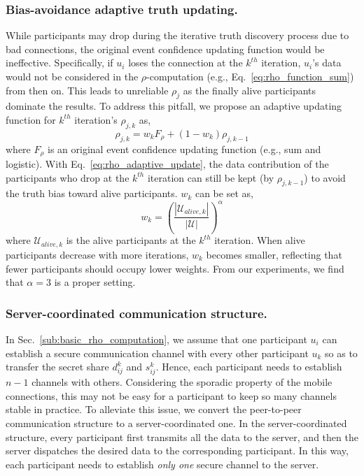 \subsubsection{Bias-avoidance adaptive truth updating.}
\label{sub:adaptive_truth_updating}
While participants may drop during the iterative truth discovery process due to bad connections, the original event confidence updating function would be ineffective. Specifically, if $u_i$ loses the connection at the $k^{th}$ iteration, $u_i$'s data would not be considered in the $\rho$-computation (e.g., Eq.~\ref{eq:rho_function_sum}) from then on. This leads to unreliable $\rho_j$ as the finally alive participants dominate the results. To address this pitfall, we propose an adaptive updating function for $k^{th}$ iteration's $\rho_{j,k}$ as,
\begin{equation}
	\rho_{j,k} = w_k F_\rho + (1-w_k) \rho_{j,k-1}
	\label{eq:rho_adaptive_update}
\end{equation}
where $F_\rho$ is an original event confidence updating function (e.g., sum and logistic). With Eq.~\ref{eq:rho_adaptive_update}, the data contribution of the participants who drop at the $k^{th}$ iteration can still be kept (by $\rho_{j,k-1}$) to avoid the truth bias toward alive participants. $w_k$ can be set as,
\begin{equation}
	w_k = (\frac{|\mathcal U_{alive,k}|}{|\mathcal U|})^\alpha
	\label{eq:adaptive_weight}
\end{equation}
where $\mathcal U_{alive,k}$ is the alive participants at the $k^{th}$ iteration. When alive participants decrease with more iterations, $w_k$ becomes smaller, reflecting that fewer participants should occupy lower weights. From our experiments, we find that $\alpha=3$ is a proper setting.

\subsubsection{Server-coordinated communication structure.}
\label{subsub:server_coordination}

In Sec.~\ref{sub:basic_rho_computation}, we assume that one participant $u_i$ can establish a secure communication channel with every other participant $u_k$ so as to transfer the secret share $d_{ij}^k$ and $s_{ij}^k$. Hence, each participant needs to establish $n-1$ channels with others. Considering the sporadic property of the mobile connections, this may not be easy for a participant to keep so many channels stable in practice. To alleviate this issue, we convert the peer-to-peer communication structure to a server-coordinated one. In the server-coordinated structure, every participant first transmits all the data to the server, and then the server dispatches the desired data to the corresponding participant. In this way, each participant  needs to establish \textit{only one} secure channel to the server.

